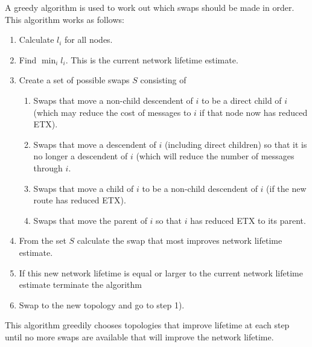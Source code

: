 A greedy algorithm is used to work out which swaps should be made in order.  This algorithm works as follows:
\begin{enumerate}
\item Calculate $l_i$ for all nodes.
\item Find $\min_i l_i$.  This is the current network lifetime estimate.
\item Create a set of possible swaps $S$ consisting of 
\begin{enumerate}
\item Swaps that move a non-child descendent of $i$ to be a direct child of $i$ (which may reduce the cost of messages to $i$ if that node now has reduced ETX).
\item Swaps that move a descendent of $i$ (including direct children) so that it is no longer a descendent of $i$ (which will reduce the number of messages through $i$.
\item Swaps that move a child of $i$ to be a non-child descendent of $i$ (if the new route has reduced ETX).
\item Swaps that move the parent of $i$ so that $i$ has reduced ETX to its parent.
\end{enumerate}
\item From the set $S$ calculate the swap that most improves network lifetime estimate.
\item If this new network lifetime is equal or larger to the current network lifetime estimate terminate the algorithm
\item Swap to the new topology and go to step 1).
\end{enumerate}

This algorithm greedily chooses topologies that improve lifetime at each step until no more swaps are available that will improve the network lifetime.


